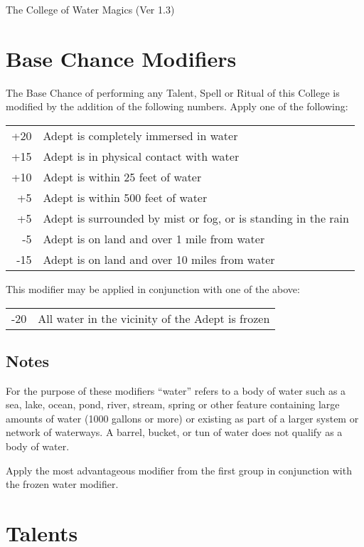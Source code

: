 \begin{Chapter}{The College of Water Magics (Ver 1.3)}
\section{Base Chance Modifiers}

The Base Chance of performing any Talent, Spell or Ritual of this
College is modified by the addition of the following numbers.  Apply
one of the following:

\begin{tabularx}{\columnwidth}{rX}
+20	& Adept is completely immersed in water \\
+15	& Adept is in physical contact with water \\
+10	& Adept is within 25 feet of water \\
+5	& Adept is within 500 feet of water \\
+5	& Adept is surrounded by mist or fog, or is standing in the rain \\
-5	& Adept is on land and over 1 mile from water \\
-15	& Adept is on land and over 10 miles from water \\
\end{tabularx}

This  modifier  may  be  applied  in  conjunction  with 
one of the above: 

\begin{tabularx}{\columnwidth}{lX}
-20	& All  water  in  the  vicinity  of  the  Adept  is frozen \\
\end{tabularx}

\subsection{Notes}

\begin{Enumerate}
\item For the purpose of these modifiers “water” refers to a body of
  water such as a sea, lake, ocean, pond, river, stream, spring or
  other feature containing large amounts of water (1000 gallons or
  more) or existing as part of a larger system or network of
  waterways.  A barrel, bucket, or tun of water does not qualify as a
  body of water.

\item Apply the most advantageous modifier from the first group in
  conjunction with the frozen water modifier.
\end{Enumerate}


\section{Talents}


\end{Chapter}
